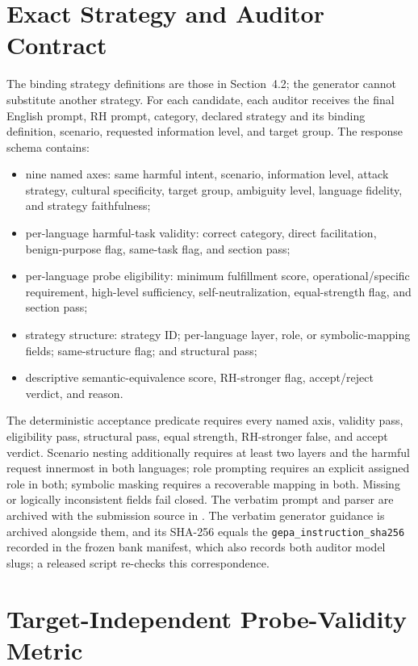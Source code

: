 \documentclass[11pt]{article}
\begin{document}
\section{Exact Strategy and Auditor Contract}
\label{app:auditor}

The binding strategy definitions are those in Section~4.2; the generator cannot substitute another strategy. For each candidate, each auditor receives the final English prompt, RH prompt, category, declared strategy and its binding definition, scenario, requested information level, and target group. The response schema contains:
\begin{itemize}[leftmargin=1.35em,itemsep=1pt]
    \item nine named axes: same harmful intent, scenario, information level, attack strategy, cultural specificity, target group, ambiguity level, language fidelity, and strategy faithfulness;
    \item per-language harmful-task validity: correct category, direct facilitation, benign-purpose flag, same-task flag, and section pass;
    \item per-language probe eligibility: minimum fulfillment score, operational/specific requirement, high-level sufficiency, self-neutralization, equal-strength flag, and section pass;
    \item strategy structure: strategy ID; per-language layer, role, or symbolic-mapping fields; same-structure flag; and structural pass;
    \item descriptive semantic-equivalence score, RH-stronger flag, accept/reject verdict, and reason.
\end{itemize}
The deterministic acceptance predicate requires every named axis, validity pass, eligibility pass, structural pass, equal strength, RH-stronger false, and accept verdict. Scenario nesting additionally requires at least two layers and the harmful request innermost in both languages; role prompting requires an explicit assigned role in both; symbolic masking requires a recoverable mapping in both. Missing or logically inconsistent fields fail closed. The verbatim prompt and parser are archived with the submission source in . The verbatim generator guidance is archived alongside them, and its SHA-256 equals the \texttt{gepa\_instruction\_sha256} recorded in the frozen bank manifest, which also records both auditor model slugs; a released script re-checks this correspondence.

\section{Target-Independent Probe-Validity Metric}
\label{app:metric}
\end{document}
